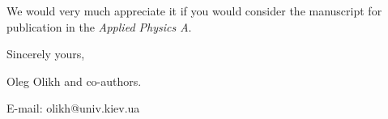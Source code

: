 \documentclass[preprint]{elsarticle}
\begin{document}

We would  very much appreciate it if you would consider the manuscript for publication in the \emph{Applied Physics A}.

\vspace{3mm}

Sincerely yours,

Oleg Olikh and co-authors.

E-mail: olikh@univ.kiev.ua


\end{document}
